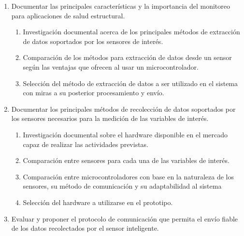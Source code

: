 \documentclass[12pt,letterpaper]{article}
\begin{document}
\begin{enumerate}[1.]



	\item Documentar las principales características y la importancia del monitoreo para aplicaciones de salud estructural.

	      \begin{enumerate}

		      \item Investigación documental acerca de los principales métodos de extracción de datos soportados por los sensores de interés.

		      \item Comparación de los métodos para extracción de datos desde un sensor según las ventajas que ofrecen al usar un microcontrolador.

		      \item Selección del método de extracción de datos a ser utilizado en el sistema con miras a su posterior procesamiento y envío.


	      \end{enumerate}

	\item  Documentar los principales métodos de recolección de datos soportados por los sensores necesarios para la medición de las variables de interés.


	      \begin{enumerate}

		      \item Investigación documental sobre el hardware disponible en el mercado capaz de realizar las actividades previstas.

		      \item Comparación entre sensores para cada una de las variables de interés.

		      \item Comparación entre microcontroladores con base en la naturaleza de los sensores, su método de comunicación y su adaptabilidad al sistema

		      \item Selección del hardware a utilizarse en el prototipo.



	      \end{enumerate}


	\item Evaluar y proponer el protocolo de comunicación que permita el envío fiable de los datos recolectados por el sensor inteligente.


\end{enumerate}
\end{document}
